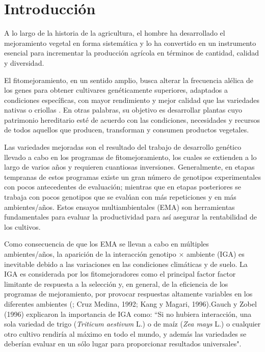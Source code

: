 

\chapter{Introducción}

A lo largo de la historia de la agricultura, el hombre ha desarrollado el mejoramiento vegetal en forma sistemática y lo ha convertido en un instrumento esencial para incrementar la producción agrícola en términos de cantidad, calidad y diversidad.  

El fitomejoramiento, en un sentido amplio, busca alterar la frecuencia alélica de los genes para obtener cultivares  genéticamente superiores, adaptados a condiciones específicas, con mayor rendimiento y mejor calidad que las variedades nativas o criollas \citep{Allard67}. En otras palabras, su objetivo es desarrollar plantas cuyo patrimonio hereditario esté de acuerdo con las condiciones, necesidades y recursos de  todos aquellos que producen, transforman y consumen productos vegetales. 

Las variedades mejoradas son el resultado del trabajo de desarrollo genético llevado a cabo en los programas de fitomejoramiento, los cuales se extienden a lo largo de varios años y requieren cuantiosas inversiones. Generalmente, en etapas tempranas de estos programas existe un gran número de genotipos experimentales con pocos antecedentes de evaluación; mientras que en etapas posteriores  se trabaja con pocos genotipos que se evalúan con más repeticiones y en más ambientes/años. Estos ensayos multiambientales (EMA) son herramientas fundamentales para evaluar la productividad para así asegurar la rentabilidad de los cultivos.

Como consecuencia de que los EMA se llevan a cabo en múltiples ambientes/años, la aparición de la interacción genotipo $\times$ ambiente (IGA) es inevitable debido a las variaciones en las condiciones climáticas y de suelo. La IGA es considerada por los fitomejoradores como el principal factor factor limitante de  respuesta a la selección y, en general, de la eficiencia de los programas de mejoramiento, por provocar respuestas altamente variables en los diferentes ambientes (\citet{Crossaetal1990}; Cruz Medina, 1992; Kang y Magari, 1996).Gauch y Zobel (1996) explicaron la importancia de IGA como: “Si no hubiera interacción, una sola variedad de trigo (\emph{Triticum aestivum} L.) o de maíz (\emph{Zea mays} L.) o cualquier otro cultivo rendiría al máximo en todo el mundo, y además las variedades se deberían evaluar en un sólo lugar para proporcionar resultados universales".



